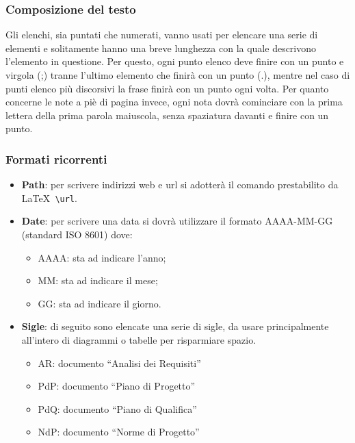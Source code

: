 \subsubsection{Composizione del testo}
Gli elenchi, sia puntati che numerati, vanno usati per elencare una serie di elementi e solitamente hanno una breve lunghezza con la quale descrivono l'elemento in questione. Per questo, ogni punto elenco deve finire con un punto e virgola (;) tranne l'ultimo elemento che finirà con un punto (.), mentre nel caso di punti elenco più discorsivi la frase finirà con un punto ogni volta.
\newline
Per quanto concerne le note a piè di pagina invece, ogni nota dovrà cominciare con la prima lettera della prima parola maiuscola, senza spaziatura davanti e finire con un punto.

\subsubsection{Formati ricorrenti}
\label{sec:formati_ricorrenti} 
\begin{itemize}
\item \textbf{Path}: per scrivere indirizzi web e url si adotterà il comando prestabilito da \LaTeX \verb+ \url+.
\item \textbf{Date}: per scrivere una data si dovrà utilizzare il formato AAAA-MM-GG (standard ISO 8601) dove:
\begin{itemize}
\item AAAA: sta ad indicare l'anno;
\item MM: sta ad indicare il mese;
\item GG: sta ad indicare il giorno.
\end{itemize}
\item \textbf{Sigle}: di seguito sono elencate una serie di sigle, da usare principalmente all'intero di diagrammi o tabelle per risparmiare spazio.
\begin{itemize}
\item AR: documento ``Analisi dei Requisiti''
\item PdP: documento ``Piano di Progetto''
\item PdQ: documento ``Piano di Qualifica''
\item NdP: documento ``Norme di Progetto''
\end{itemize}
\end{itemize}

